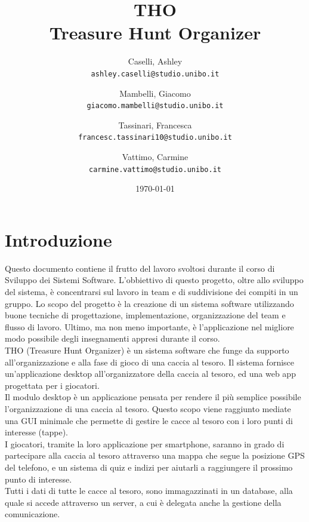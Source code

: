\documentclass[12pt, italian]{article}
\title{\textbf{THO\\Treasure Hunt Organizer}}
\author{
	Caselli, Ashley\\
	\texttt{ashley.caselli@studio.unibo.it}
	\and
	Mambelli, Giacomo\\
	\texttt{giacomo.mambelli@studio.unibo.it}
	\and
	Tassinari, Francesca\\
	\texttt{francesc.tassinari10@studio.unibo.it}
	\and
	Vattimo, Carmine\\
	\texttt{carmine.vattimo@studio.unibo.it}
}
\date{\today}
\begin{document}
\maketitle
\newpage
\tableofcontents
\newpage

\section{Introduzione}
Questo documento contiene il frutto del lavoro svoltosi durante il corso di Sviluppo dei Sistemi Software. L'obbiettivo di questo progetto, oltre allo sviluppo del sistema, è concentrarsi sul lavoro in team e di suddivisione dei compiti in un gruppo.
Lo scopo del progetto è la creazione di un sistema software utilizzando buone tecniche di progettazione, implementazione, organizzazione del team e flusso di lavoro. Ultimo, ma non meno importante, è l'applicazione nel migliore modo possibile degli insegnamenti appresi durante il corso.\\

THO (Treasure Hunt Organizer) è un sistema software che funge da supporto all'organizzazione e alla fase di gioco di una caccia al tesoro. Il sistema fornisce un'applicazione desktop all'organizzatore della caccia al tesoro, ed una web app progettata per i giocatori.\\
Il modulo desktop è un applicazione pensata per rendere il più semplice possibile l'organizzazione di una caccia al tesoro. Questo scopo viene raggiunto mediate una GUI minimale che permette di gestire le cacce al tesoro con i loro punti di interesse (tappe).\\

I giocatori, tramite la loro applicazione per smartphone, saranno in grado di partecipare alla caccia al tesoro attraverso una mappa che segue la posizione GPS del telefono, e un sistema di quiz e indizi per aiutarli a raggiungere il prossimo punto di interesse.\\
Tutti i dati di tutte le cacce al tesoro, sono immagazzinati in un database, alla quale si accede attraverso un server, a cui è delegata anche la gestione della comunicazione.

\newpage
\end{document}

